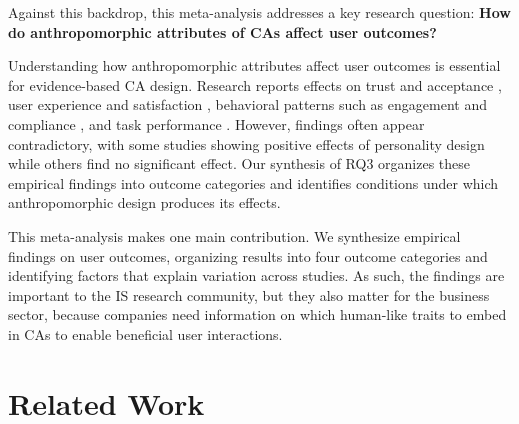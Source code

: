 \documentclass[manuscript,anonymous,sigconf]{acmart}
\begin{document}
Against this backdrop, this meta-analysis addresses a key research question: \textbf{How do anthropomorphic attributes of CAs affect user outcomes?}

Understanding how anthropomorphic attributes affect user outcomes is essential for evidence-based CA design. Research reports effects on trust and acceptance \citep{kraus_role_2021,chandra_be_2022}, user experience and satisfaction \citep{lieb_student_2024,liu_older_2023}, behavioral patterns such as engagement and compliance \citep{mehra_chatbot_2021,chen_you_2021}, and task performance \citep{zheldibayeva_genai_2025,baihaqi_rapport-driven_2024}. However, findings often appear contradictory, with some studies showing positive effects of personality design while others find no significant effect. Our synthesis of RQ3 organizes these empirical findings into outcome categories and identifies conditions under which anthropomorphic design produces its effects.


This meta-analysis makes one main contribution. We synthesize empirical findings on user outcomes, organizing results into four outcome categories and identifying factors that explain variation across studies. As such, the findings are important to the IS research community, but they also matter for the business sector, because companies need information on which human-like traits to embed in CAs to enable beneficial user interactions.


\section{Related Work}

\end{document}
